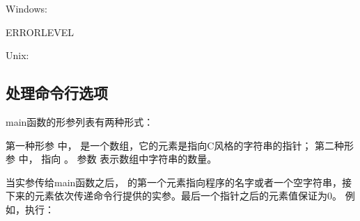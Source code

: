 \documentclass[letterpaper,10pt,english]{sphinxmanual}
\begin{document}
Windows:

%
\begin{sphinxVerbatim}[commandchars=\\\{\}]
 \PYGZpc{}ERRORLEVEL\PYGZpc{}
\end{sphinxVerbatim}

Unix:

%
\begin{sphinxVerbatim}[commandchars=\\\{\}]
 
\end{sphinxVerbatim}


\subsection{处理命令行选项}
\label{\detokenize{cpp/01_main:id2}}
main函数的形参列表有两种形式：

%
\begin{sphinxVerbatim}[commandchars=\\\{\}]
    \PYG{p}{[}\PYG{p}{]}  

      
\end{sphinxVerbatim}

第一种形参  中， 是一个数组，它的元素是指向C风格的字符串的指针；
第二种形参  中， 指向  。
参数  表示数组中字符串的数量。

当实参传给main函数之后， 的第一个元素指向程序的名字或者一个空字符串，接下来的元素依次传递命令行提供的实参。最后一个指针之后的元素值保证为0。
例如，执行：

%
\begin{sphinxVerbatim}[commandchars=\\\{\}]
    
\end{sphinxVerbatim}
\end{document}
